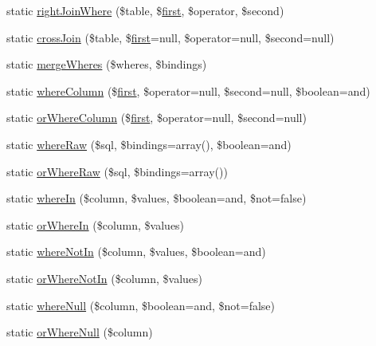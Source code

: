 \begin{DoxyCompactItemize}
static \mbox{\hyperlink{class_eloquent_a7da048e8b8edcf7c9fc154756d95217f}{right\+Join\+Where}} (\$table, \$\mbox{\hyperlink{class_eloquent_a9a02499790abaadb7a9dc307a2b8403a}{first}}, \$operator, \$second)
\item 
static \mbox{\hyperlink{class_eloquent_a8a23e4c7ff6e59bf6a8337018dcf1063}{cross\+Join}} (\$table, \$\mbox{\hyperlink{class_eloquent_a9a02499790abaadb7a9dc307a2b8403a}{first}}=null, \$operator=null, \$second=null)
\item 
static \mbox{\hyperlink{class_eloquent_ad8f6918463427fbcea1a870ec8ffd883}{merge\+Wheres}} (\$wheres, \$bindings)
\item 
static \mbox{\hyperlink{class_eloquent_a3bdca7345f418215cb3e48ccea64f8e2}{where\+Column}} (\$\mbox{\hyperlink{class_eloquent_a9a02499790abaadb7a9dc307a2b8403a}{first}}, \$operator=null, \$second=null, \$boolean=\textquotesingle{}and\textquotesingle{})
\item 
static \mbox{\hyperlink{class_eloquent_a7fb5678acda4390052f891418895762a}{or\+Where\+Column}} (\$\mbox{\hyperlink{class_eloquent_a9a02499790abaadb7a9dc307a2b8403a}{first}}, \$operator=null, \$second=null)
\item 
static \mbox{\hyperlink{class_eloquent_a67c4e71aff7e9c4304516de058845610}{where\+Raw}} (\$sql, \$bindings=array(), \$boolean=\textquotesingle{}and\textquotesingle{})
\item 
static \mbox{\hyperlink{class_eloquent_afbe643f67e54beddea0721074a50093e}{or\+Where\+Raw}} (\$sql, \$bindings=array())
\item 
static \mbox{\hyperlink{class_eloquent_ae4274acd45de3339f0718ad3fa0fea34}{where\+In}} (\$column, \$values, \$boolean=\textquotesingle{}and\textquotesingle{}, \$not=false)
\item 
static \mbox{\hyperlink{class_eloquent_ac49cc6a793b16ab8edc3eb0b91d0c355}{or\+Where\+In}} (\$column, \$values)
\item 
static \mbox{\hyperlink{class_eloquent_aea049d383c88e86dc7456fb0aed328f5}{where\+Not\+In}} (\$column, \$values, \$boolean=\textquotesingle{}and\textquotesingle{})
\item 
static \mbox{\hyperlink{class_eloquent_a07382bcdd1d4e66e2440cc1c5f5ba77b}{or\+Where\+Not\+In}} (\$column, \$values)
\item 
static \mbox{\hyperlink{class_eloquent_ae53f3a49e729b996083e5d835f737e23}{where\+Null}} (\$column, \$boolean=\textquotesingle{}and\textquotesingle{}, \$not=false)
\item 
static \mbox{\hyperlink{class_eloquent_ad05158229fe7106000cde4d97cb07537}{or\+Where\+Null}} (\$column)

\end{DoxyCompactItemize}
